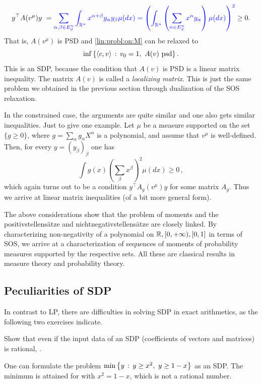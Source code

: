 \begin{align*}
	y^\top A(v^\mu) y \ = \textcolor{blue}{\sum_{\alpha,\beta \in E_d^n} \int_{\mathbb{R}^n} x^{\alpha + \beta} y_\alpha y_\beta \mu(d x)
 = \left( \int_{\mathbb{R}^n} \left(\sum_{\alpha \in E_d^n} x^\alpha y_\alpha \right) \mu(d x)\right)^2 }
 \ge 0.
\end{align*}
That is, $A(v^\mu)$ is PSD and \eqref{lin:probl:on:M} can be relaxed to 
\begin{equation}
	\label{moment:relaxation}
	\inf \left\{ \left\langle c , v \right\rangle \,:\, v_0=1, \ A(v) \ \text{psd} \right\}.
\end{equation}
This is an SDP, because the condition that $A(v)$ is PSD is a linear matrix inequality. The matrix $A(v)$ is called a \emph{localizing matrix}. 
This is just the same problem we obtained in the previous section through dualization of the SOS relaxation. 

In the constrained case, the arguments are quite similar and one also gets similar inequalities. Just to give one example. Let $\mu$ be a measure supported on the set $\{g \ge 0\}$, where $g = \sum_\alpha g_\alpha X^\alpha$ is a polynomial, and assume that $v^\mu$ is well-defined. Then, for every $y=(y_\beta)_\beta$ one has
\[
	\int g(x) \left( \sum_\beta x^\beta \right)^2 \mu( d x) \ge 0 \,,
\] 
which again turns out to be a condition $y^\top A_g(v^\mu) y$ for some matrix $A_g$. Thus we arrive at linear matrix inequalities (of a bit more general form). 

The above considerations show that the problem of moments and the positivstellens{\"a}tze and nichtnegativstellensätze are closely linked. By characterizing non-negativity of a polynomial on $\mathbb{R}, [0,+\infty),[0,1]$ in terms of SOS, we arrive at a characterization of sequences of moments of probability measures supported by the respective sets. All these are classical results in measure theory and probability theory.
 

\subsection{Peculiarities of SDP}

In contrast to LP, there are difficulties in solving SDP in exact arithmetics, as the following two exercises indicate. 

\begin{exercise}
	Show that even if the input data of an SDP (coefficients of vectors and matrices) is rational, .
\end{exercise}
\begin{solution}
	One can formulate the problem $\min \left\{ y \,:\, y \ge x^2, \ y \ge 1 -x \right\}$ as an SDP. The minimum is attained for  with $x^2 = 1 -x$, which is not a rational number.
\end{solution}

